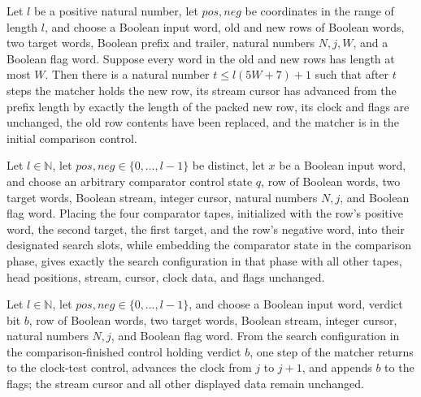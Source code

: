 \begin{lemma}
\label{Complexity.clMatch_load}
\leanok
{}
Let $l$ be a positive natural number, let $pos,neg$ be coordinates in the range of
length $l$, and choose a Boolean input word, old and new rows of Boolean words, two
target words, Boolean prefix and trailer, natural numbers $N,j,W$, and a Boolean flag
word. Suppose every word in the old and new rows has length at most $W$. Then there is a
natural number $t\le l(5W+7)+1$ such that after $t$ steps the matcher holds the new row,
its stream cursor has advanced from the prefix length by exactly the length of the
packed new row, its clock and flags are unchanged, the old row contents have been
replaced, and the matcher is in the initial comparison control.
\end{lemma}

\begin{lemma}
\label{Complexity.clMatch_cmp_frame}
\leanok
{}
Let $l\in\mathbb{N}$, let $pos,neg\in\{0,\ldots,l-1\}$ be distinct, let $x$ be a Boolean
input word, and choose an arbitrary comparator control state $q$, row of Boolean words,
two target words, Boolean stream, integer cursor, natural numbers $N,j$, and Boolean
flag word. Placing the four comparator tapes, initialized with the row's positive word,
the second target, the first target, and the row's negative word, into their designated
search slots, while embedding the comparator state in the comparison phase, gives
exactly the search configuration in that phase with all other tapes, head positions,
stream, cursor, clock data, and flags unchanged.
\end{lemma}

\begin{lemma}
\label{Complexity.clMatch_commit}
\leanok
{}
Let $l\in\mathbb{N}$, let $pos,neg\in\{0,\ldots,l-1\}$, and choose a Boolean input word,
verdict bit $b$, row of Boolean words, two target words, Boolean stream, integer cursor,
natural numbers $N,j$, and Boolean flag word. From the search configuration in the
comparison-finished control holding verdict $b$, one step of the matcher returns to the
clock-test control, advances the clock from $j$ to $j+1$, and appends $b$ to the flags;
the stream cursor and all other displayed data remain unchanged.
\end{lemma}

